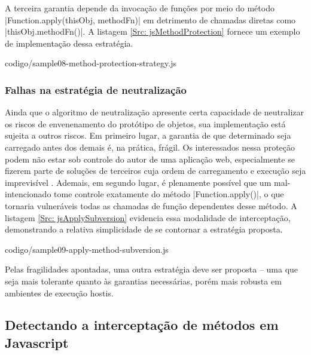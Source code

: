A terceira garantia depende da invocação de funções por meio do método |Function.apply(thisObj, methodFn)| em detrimento de chamadas diretas como |thisObj.methodFn()|. A listagem \ref{Src: jsMethodProtection} fornece um exemplo de implementação dessa estratégia.


	{codigo/sample08-method-protection-strategy.js}


\subsubsection{Falhas na estratégia de neutralização}
Ainda que o algoritmo de neutralização apresente certa capacidade de neutralizar os riscos de envenenamento do protótipo de objetos, sua implementação está sujeita a outros riscos. Em primeiro lugar, a garantia de que determinado {\script} seja carregado antes dos demais é, na prática, frágil. Os {\scripts} interessados nessa proteção podem não estar sob controle do autor de uma aplicação web, especialmente se fizerem parte de soluções de terceiros cuja ordem de carregamento e execução seja imprevisível . Ademais, em segundo lugar, é plenamente possível que um {\script} mal-intencionado tome controle exatamente do método |Function.apply()|, o que tornaria vulneráveis todas as chamadas de função dependentes desse método. A listagem \ref{Src: jsApplySubversion} evidencia essa modalidade de interceptação, demonstrando a relativa simplicidade de se contornar a estratégia proposta.


	{codigo/sample09-apply-method-subversion.js}

Pelas fragilidades apontadas, uma outra estratégia deve ser proposta -- uma que seja mais tolerante quanto às garantias necessárias, porém mais robusta em ambientes de execução hostis.


\subsection{Detectando a interceptação de métodos em Javascript}

